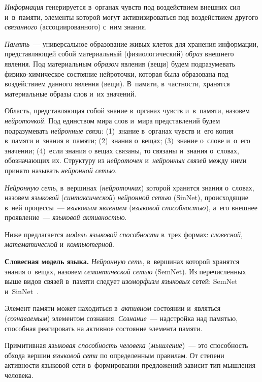 \begin{multicols}{2}
  \textit{Информация} генерируется в~органах чувств под воздействием 
внешних сил и~в~памяти, элементы которой могут активизироваться под 
воздействием другого \textit{связанного} (ассоциированного) с~ним знания.
   
  \textit{Память}~--- универсальное образование живых клеток для хранения информации, 
пред\-став\-ля\-ющей собой материальный (физиологический) \textit{образ} внеш\-не\-го явления. 
Под материальным \textit{образом} явления (вещи) будем подразумевать  
фи\-зи\-ко-хи\-ми\-че\-ское со\-сто\-яние ней\-ро\-точ\-ки, которая была образована под воздействием 
данного явления (вещи). В~памяти, в~част\-ности, хранятся материальные образы слов и~их 
значений. 
   
  Область, представляющая собой знание в~органах чувств и~в~памяти, 
назовем \textit{нейроточкой}. Под единством мира слов и~мира 
представлений будем подразумевать \textit{нейронные связи}: (1)~знание 
в~органах чувств и~его копия в~памяти и~знания в~памяти; (2)~знания 
о~вещах; (3)~знание о~слове и~о~его значении; (4)~если знания о вещах 
связаны, то связаны и~знания о~словах, обозначающих их. Структуру из 
\textit{нейроточек} и~\textit{нейронных связей} между ними принято 
называть \textit{нейронной сетью}.
  
  \textit{Нейронную сеть}, в~вершинах (\textit{нейроточках}) которой 
хранятся знания о~словах, назовем \textit{языковой} 
(\textit{синтаксической}) \textit{нейронной сетью} (SinNet), 
происходящие в~ней процессы~--- \textit{языковым явлением} (\textit{языковой 
способностью}), а~его внеш\-нее проявление~--- \textit{языковой 
активностью}.
  
  Ниже предлагается \textit{модель языковой способности} в~трех формах: 
\textit{словесной}, \textit{математической} и~\textit{компьютерной}.
  
  \textbf{Словесная модель языка.} \textit{Нейронную сеть}, в~вершинах 
которой хранятся знания о~вещах, назовем \textit{семантической сетью} 
(SemNet). Из перечисленных выше видов связей в~памяти следует 
\textit{изоморфизм языковых} сетей: SemNet и~SinNet~\cite{4-sh}.
  
  Элемент памяти может находиться в~\textit{активном} со\-сто\-янии 
и~являться (\textit{сознаваемым}) элементом сознания.  
\textit{Сознание}~--- надстройка над памятью, способная реагировать на 
активное со\-сто\-яние элемента памяти. 
  
  Примитивная \textit{языковая способность человека} 
(\textit{мышление})~--- это способность обхода вершин \textit{языковой 
сети} по определенным правилам. От степени ак\-тив\-ности языковой сети 
в~формировании предложений зависит тип мыш\-ле\-ния человека.


\end{multicols}

